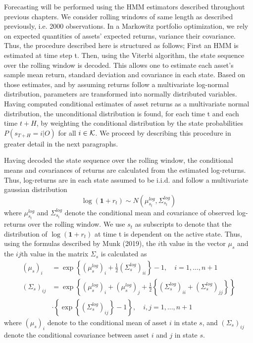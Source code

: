 Forecasting will be performed using the HMM estimators described throughout previous chapters. We consider rolling windows of same length as described previously, i.e. 2000 observations. In a Markowitz portfolio optimization, we rely on expected quantities of assets' expected returns, variance their covariance. Thus, the procedure described here is structured as follows; First an HMM is estimated at time step t. Then, using the Viterbi algorithm, the state sequence over the rolling window is decoded. This allows one to estimate each asset's sample mean return, standard deviation and covariance in each state. Based on those estimates, and by assuming returns follow a multivariate log-normal distribution, parameters are transformed into normally distributed variables. Having computed conditional estimates of asset returns as a multivariate normal distribution, the unconditional distribution is found, for each time t and each time $t+H$, by weighting the conditional distribution by the state probabilities $P(s_{T+H}=i | O)$ for all $i\in\operatorname{\mathcal{K}}$. We proceed by describing this procedure in greater detail in the next paragraphs.

Having decoded the state sequence over the rolling window, the conditional means and covariances of returns are calculated from the estimated log-returns. Thus, log-returns are in each state assumed to be i.i.d. and follow a multivariate gaussian distribution
\begin{equation}
    \log(\mathbf{1}+ r_t) \sim N\left(\mu_{s_t}^{log}, \Sigma_{s_t}^{log}  \right)
\end{equation}
where $\mu_{s_t}^{log}$ and $\Sigma_{s_t}^{log}$ denote the conditional mean and covariance of observed log-returns over the rolling window. We use $s_t$ as subscripts to denote that the distribution of $\log(\mathbf{1}+ r_t)$ at time t is dependent on the active state. Thus, using the formulas described by Munk (2019), the $i$th value in the vector $\mu_s$ and the $ij$th value in the matrix $\Sigma_s$ is calculated as
\begin{align}
    (\mu_{s})_i &= \exp \left\{(\mu_{s}^{log})_i + \frac{1}{2}(\Sigma_{s}^{log})_{ii} \right\} - 1,
    \quad i = 1,\ldots, n+1
    \\
    (\Sigma_{s})_{ij} &= \exp \left\{(\mu_{s}^{log})_i + (\mu_{s}^{log})_j + \frac{1}{2}\left\{(\Sigma_{s}^{log})_{ii} + (\Sigma_{s}^{log})_{jj} \right\} \right\} \\
    &\cdot \left\{ \exp \left\{ (\Sigma_{s}^{log})_{ij} \right\} - 1 \right\} \nonumber
    , \quad i,j = 1,\ldots,n+1
\end{align}
where $(\mu_{s})_i$ denote to the conditional mean of asset $i$ in state $s$, and $(\Sigma_{s})_{ij}$ denote the conditional covariance between asset $i$ and $j$ in state $s$.

